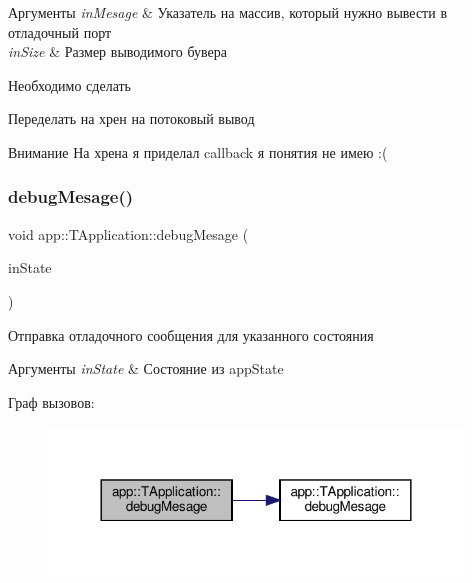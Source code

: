  
\begin{DoxyParams}{Аргументы}
{\em in\+Mesage} & Указатель на массив, который нужно вывести в отладочный порт \\
\hline
{\em in\+Size} & Размер выводимого бувера \\
\hline
\end{DoxyParams}
\begin{DoxyRefDesc}{Необходимо сделать}
\item[\hyperlink{todo__todo000002}{Необходимо сделать}]Переделать на хрен на потоковый вывод \end{DoxyRefDesc}
\begin{DoxyAttention}{Внимание}
На хрена я приделал callback я понятия не имею \+:( 
\end{DoxyAttention}
\mbox{\label{classapp_1_1_t_application_af84d71d883cf0745649afe65d70d290c}} 
\subsubsection{\texorpdfstring{debug\+Mesage()}{debugMesage()}\hspace{0.1cm}{\footnotesize\ttfamily [4/4]}}
{\footnotesize\ttfamily void app\+::\+T\+Application\+::debug\+Mesage (\begin{DoxyParamCaption}\item[{const \hyperlink{group___xD0_x9F_xD0_xB5_xD1_x80_xD0_xB5_xD1_x87_xD0_xB8_xD1_x81_xD0_xBB_xD0_xB5_xD0_xBD_xD0_xB8_xD1_x8F_ga290e8080c661e52c2f685fd4af148acf}{app\+State}}]{in\+State }\end{DoxyParamCaption})}



Отправка отладочного сообщения для указанного состояния 


\begin{DoxyParams}{Аргументы}
{\em in\+State} & Состояние из app\+State \\
\hline
\end{DoxyParams}
Граф вызовов\+:\nopagebreak
\begin{figure}[H]
\begin{center}
\leavevmode
\includegraphics[width=312pt]{classapp_1_1_t_application_af84d71d883cf0745649afe65d70d290c_cgraph}
\end{center}
\end{figure}
\mbox{\label{classapp_1_1_t_application_aa2cb4a923a937f1a47a28fb5efe3b943}} 
